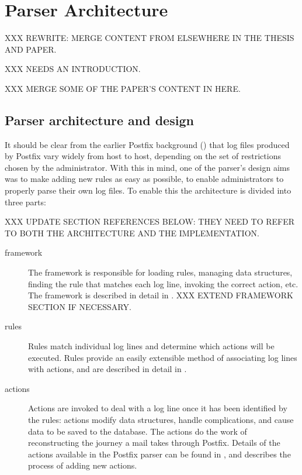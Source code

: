 \section{Parser Architecture}

XXX REWRITE\@: MERGE CONTENT FROM ELSEWHERE IN THE THESIS AND PAPER\@.

XXX NEEDS AN INTRODUCTION\@.

XXX MERGE SOME OF THE PAPER'S CONTENT IN HERE\@.

\subsection{Parser architecture and design}

\label{parser design}

It should be clear from the earlier Postfix background () that log files produced by Postfix vary widely from host to
host, depending on the set of restrictions chosen by the administrator.
With this in mind, one of the parser's design aims was to make adding new
rules as easy as possible, to enable administrators to properly parse their
own log files.  To enable this the architecture is divided into three
parts:

XXX UPDATE SECTION REFERENCES BELOW\@: THEY NEED TO REFER TO BOTH THE
ARCHITECTURE AND THE IMPLEMENTATION\@.

\begin{description}

    \item [framework] The framework is responsible for loading rules,
        managing data structures, finding the rule that matches each log
        line, invoking the correct action, etc\@.  The framework is
        described in detail in .  XXX EXTEND
        FRAMEWORK SECTION IF NECESSARY\@.

    \item [rules] Rules match individual log lines and determine which
        actions will be executed.  Rules provide an easily extensible
        method of associating log lines with actions, and are described in
        detail in .

    \item [actions] Actions are invoked to deal with a log line once it has
        been identified by the rules: actions modify data structures,
        handle complications, and cause data to be saved to the database.
        The actions do the work of reconstructing the journey a mail takes
        through Postfix.  Details of the actions available in the Postfix
        parser can be found in , and
         describes the process of adding new
        actions.

\end{description}

